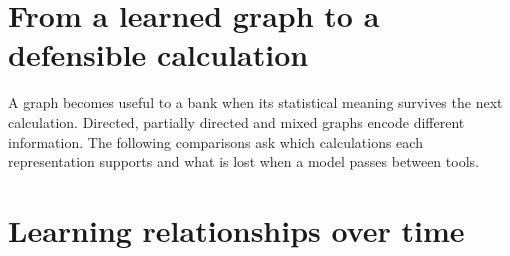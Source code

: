 \documentclass[11pt,a4paper,openany]{book}
\begin{document}
\chapter{From a learned graph to a defensible calculation}
A graph becomes useful to a bank when its statistical meaning survives
the next calculation. Directed, partially directed and mixed graphs encode
different information. The following comparisons ask which calculations each
representation supports and what is lost when a model passes between tools.







\chapter{Learning relationships over time}
\end{document}
